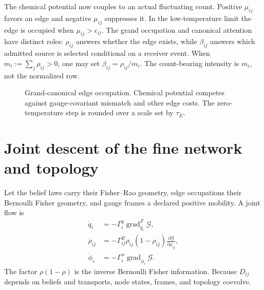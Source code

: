 \documentclass[11pt,letterpaper]{article}
\newcommand{\cG}{\mathcal G}
\newcommand{\grad}{\operatorname{grad}}
\begin{document}
The chemical potential now couples to an actual fluctuating count.  Positive $\mu_{ij}$ favors an edge and negative $\mu_{ij}$ suppresses it.  In the low-temperature limit the edge is occupied when $\mu_{ij}>\epsilon_{ij}$.  The grand occupation and canonical attention have distinct roles: $\rho_{ij}$ answers whether the edge exists, while $\beta_{ij}$ answers which admitted source is selected conditional on a receiver event.  When $m_i:=\sum_j\rho_{ij}>0$, one may set $\beta_{ij}=\rho_{ij}/m_i$.  The count-bearing intensity is $m_i$, not the normalized row.

\begin{figure}[t]
\centering
{}
\caption{Grand-canonical edge occupation.  Chemical potential competes against gauge-covariant mismatch and other edge costs.  The zero-temperature step is rounded over a scale set by $\tau_E$.}
\label{fig:edge-threshold}
\end{figure}

\section{Joint descent of the fine network and topology}

Let the belief laws carry their Fisher--Rao geometry, edge occupations their Bernoulli Fisher geometry, and gauge frames a declared positive mobility.  A joint flow is
\begin{align}
 \dot q_i&=-\Gamma_i^q\grad_{q_i}^{F}\cG,
 \label{eq:q-flow}\\
 \dot\rho_{ij}&=-\Gamma_{ij}^{E}\rho_{ij}(1-\rho_{ij})
 \frac{\partial\cG}{\partial\rho_{ij}},
 \label{eq:rho-flow}\\
 \dot\phi_i&=-\Gamma_i^{\phi}\grad_{\phi_i}\cG.
 \label{eq:gauge-flow}
\end{align}
The factor $\rho(1-\rho)$ is the inverse Bernoulli Fisher information.  Because $D_{ij}$ depends on beliefs and transports, node states, frames, and topology coevolve.
\end{document}
